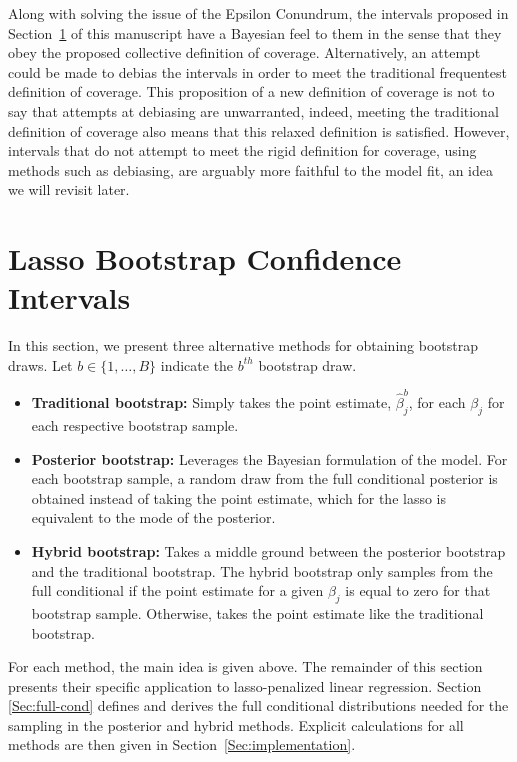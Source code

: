Along with solving the issue of the Epsilon Conundrum, the intervals proposed in Section~\ref{Sec:methods} of this manuscript have a Bayesian feel to them in the sense that they obey the proposed collective definition of coverage. Alternatively, an attempt could be made to debias the intervals in order to meet the traditional frequentest definition of coverage. This proposition of a new definition of coverage is not to say that attempts at debiasing are unwarranted, indeed, meeting the traditional definition of coverage also means that this relaxed definition is satisfied. However, intervals that do not attempt to meet the rigid definition for coverage, using methods such as debiasing, are arguably more faithful to the model fit, an idea we will revisit later. 


\section{Lasso Bootstrap Confidence Intervals}\label{Sec:methods}

In this section, we present three alternative methods for obtaining bootstrap draws. Let $b \in \lbrace 1, \ldots, B \rbrace$ indicate the $b^{th}$ bootstrap draw.

\begin{itemize}
\item \textbf{Traditional bootstrap:} Simply takes the point estimate, $\hat{\beta}_j^b$,  for each $\beta_j$ for each respective bootstrap sample.
\item \textbf{Posterior bootstrap:} Leverages the Bayesian formulation of the model. For each bootstrap sample, a random draw from the full conditional posterior is obtained instead of taking the point estimate, which for the lasso is equivalent to the mode of the posterior.
\item \textbf{Hybrid bootstrap:} Takes a middle ground between the posterior bootstrap and the traditional bootstrap. The hybrid bootstrap only samples from the full conditional if the point estimate for a given $\beta_j$ is equal to zero for that bootstrap sample. Otherwise, takes the point estimate like the traditional bootstrap.
\end{itemize}

For each method, the main idea is given above. The remainder of this section presents their specific application to lasso-penalized linear regression. Section \ref{Sec:full-cond} defines and derives the full conditional distributions needed for the sampling in the posterior and hybrid methods. Explicit calculations for all  methods are then given in Section~\ref{Sec:implementation}.

